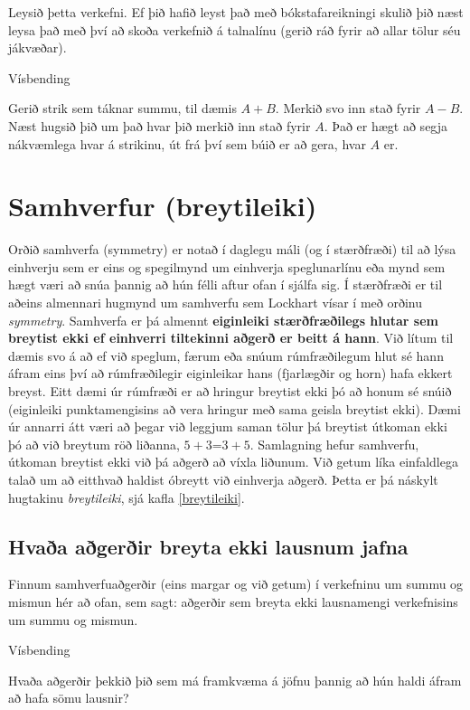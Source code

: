 \documentclass[
  icelandic,
]{book}
\begin{document}
Leysið þetta verkefni. Ef þið hafið leyst það með bókstafareikningi skulið þið næst leysa það með því að skoða verkefnið á talnalínu (gerið ráð fyrir að allar tölur séu jákvæðar).

Vísbending

Gerið strik sem táknar summu, til dæmis \(A+B\). Merkið svo inn stað fyrir \(A-B\). Næst hugsið þið um það hvar þið merkið inn stað fyrir \(A\). Það er hægt að segja nákvæmlega hvar á strikinu, út frá því sem búið er að gera, hvar \(A\) er.

\section{Samhverfur (breytileiki)}\label{samhverfur}

Orðið samhverfa (symmetry) er notað í daglegu máli (og í stærðfræði) til að lýsa einhverju sem er eins og spegilmynd um einhverja speglunarlínu eða mynd sem hægt væri að snúa þannig að hún félli aftur ofan í sjálfa sig. Í stærðfræði er til aðeins almennari hugmynd um samhverfu sem Lockhart vísar í með orðinu \emph{symmetry}. Samhverfa er þá almennt \textbf{eiginleiki stærðfræðilegs hlutar sem breytist ekki ef einhverri tiltekinni aðgerð er beitt á hann}. Við lítum til dæmis svo á að ef við speglum, færum eða snúum rúmfræðilegum hlut sé hann áfram eins því að rúmfræðilegir eiginleikar hans (fjarlægðir og horn) hafa ekkert breyst. Eitt dæmi úr rúmfræði er að hringur breytist ekki þó að honum sé snúið (eiginleiki punktamengisins að vera hringur með sama geisla breytist ekki). Dæmi úr annarri átt væri að þegar við leggjum saman tölur þá breytist útkoman ekki þó að við breytum röð liðanna, \(5+3\)=\(3+5\). Samlagning hefur samhverfu, útkoman breytist ekki við þá aðgerð að víxla liðunum. Við getum líka einfaldlega talað um að eitthvað haldist óbreytt við einhverja aðgerð. Þetta er þá náskylt hugtakinu \emph{breytileiki}, sjá kafla \ref{breytileiki}.

\subsection{Hvaða aðgerðir breyta ekki lausnum jafna}\label{samhverfur-jafna}

Finnum samhverfuaðgerðir (eins margar og við getum) í verkefninu um summu og mismun hér að ofan, sem sagt: aðgerðir sem breyta ekki lausnamengi verkefnisins um summu og mismun.

Vísbending

Hvaða aðgerðir þekkið þið sem má framkvæma á jöfnu þannig að hún haldi áfram að hafa sömu lausnir?
\end{document}

